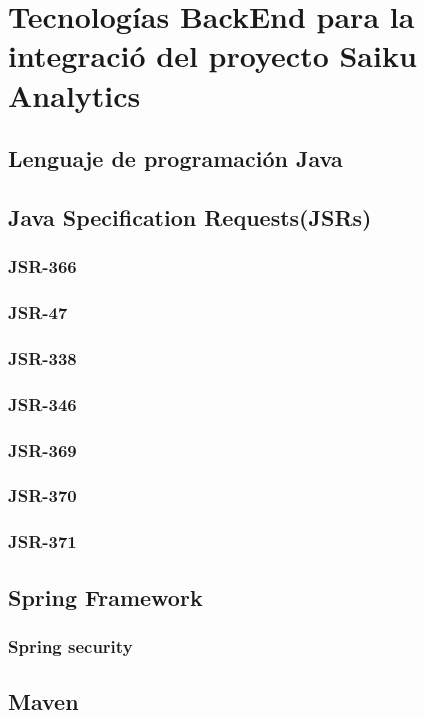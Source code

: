 \section{Tecnolog\'{i}as BackEnd para la integraci\'{o} del proyecto Saiku Analytics}
	\subsection{Lenguaje de programaci\'{o}n Java}
	\subsection{Java Specification Requests(JSRs)}
		\subsubsection{JSR-366}
				\lipsum[1-2]
		\subsubsection{JSR-47}
				\lipsum[1-2]
		\subsubsection{JSR-338}
				\lipsum[1-2]
		\subsubsection{JSR-346}
				\lipsum[1-2]
		\subsubsection{JSR-369}
				\lipsum[1-2]
		\subsubsection{JSR-370}
		\lipsum[1-2]
		\subsubsection{JSR-371}
		\lipsum[1-2]
	\subsection{Spring Framework}
		\subsubsection{Spring security}
	\subsection{Maven}

